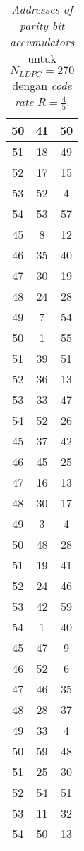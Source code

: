 \begin{table}[tb]
	\centering
	\caption{\textit{Addresses of parity bit accumulators} untuk $N_{LDPC}=270$ dengan \textit{code rate} $R=\frac{4}{5}$.}
	\label{table:rate2}
\begin{tabular}{|c|c|c|}
	\hline
	50 & 41 & 50 \\ \hline
	51 & 18 & 49 \\ \hline
	52 & 17 & 15 \\ \hline
	53 & 52 & 4  \\ \hline
	54 & 53 & 57 \\ \hline
	45 & 8  & 12 \\ \hline
	46 & 35 & 40 \\ \hline
	47 & 30 & 19 \\ \hline
	48 & 24 & 28 \\ \hline
	49 & 7  & 54 \\ \hline
	50 & 1  & 55 \\ \hline
	51 & 39 & 51 \\ \hline
	52 & 36 & 13 \\ \hline
	53 & 33 & 47 \\ \hline
	54 & 52 & 26 \\ \hline
	45 & 37 & 42 \\ \hline
	46 & 45 & 25 \\ \hline
	47 & 16 & 13 \\ \hline
	48 & 30 & 17 \\ \hline
	49 & 3  & 4  \\ \hline
	50 & 48 & 28 \\ \hline
	51 & 19 & 41 \\ \hline
	52 & 24 & 46 \\ \hline
	53 & 42 & 59 \\ \hline
	54 & 1  & 40 \\ \hline
	45 & 47 & 9  \\ \hline
	46 & 52 & 6  \\ \hline
	47 & 46 & 35 \\ \hline
	48 & 28 & 37 \\ \hline
	49 & 33 & 4  \\ \hline
	50 & 59 & 48 \\ \hline
	51 & 25 & 30 \\ \hline
	52 & 54 & 51 \\ \hline
	53 & 11 & 32 \\ \hline
	54 & 50 & 13 \\ \hline
\end{tabular}
	
	
\end{table}

